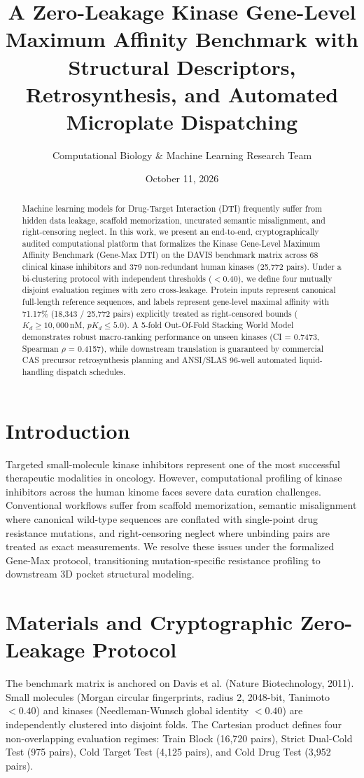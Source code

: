 \documentclass[11pt,a4paper]{article}
\title{A Zero-Leakage Kinase Gene-Level Maximum Affinity Benchmark with Structural Descriptors, Retrosynthesis, and Automated Microplate Dispatching}
\author{Computational Biology \& Machine Learning Research Team}
\date{October 11, 2026}
\begin{document}
\maketitle

\begin{abstract}
Machine learning models for Drug-Target Interaction (DTI) frequently suffer from hidden data leakage, scaffold memorization, uncurated semantic misalignment, and right-censoring neglect. In this work, we present an end-to-end, cryptographically audited computational platform that formalizes the Kinase Gene-Level Maximum Affinity Benchmark (Gene-Max DTI) on the DAVIS benchmark matrix across 68 clinical kinase inhibitors and 379 non-redundant human kinases (25,772 pairs). Under a bi-clustering protocol with independent thresholds ($<0.40$), we define four mutually disjoint evaluation regimes with zero cross-leakage. Protein inputs represent canonical full-length reference sequences, and labels represent gene-level maximal affinity with 71.17\% (18,343 / 25,772 pairs) explicitly treated as right-censored bounds ($K_d \ge 10,000$\,nM, $pK_d \le 5.0$). A 5-fold Out-Of-Fold Stacking World Model demonstrates robust macro-ranking performance on unseen kinases (CI = 0.7473, Spearman $\rho$ = 0.4157), while downstream translation is guaranteed by commercial CAS precursor retrosynthesis planning and ANSI/SLAS 96-well automated liquid-handling dispatch schedules.
\end{abstract}

\section{Introduction}
Targeted small-molecule kinase inhibitors represent one of the most successful therapeutic modalities in oncology. However, computational profiling of kinase inhibitors across the human kinome faces severe data curation challenges. Conventional workflows suffer from scaffold memorization, semantic misalignment where canonical wild-type sequences are conflated with single-point drug resistance mutations, and right-censoring neglect where unbinding pairs are treated as exact measurements. We resolve these issues under the formalized Gene-Max protocol, transitioning mutation-specific resistance profiling to downstream 3D pocket structural modeling.

\section{Materials and Cryptographic Zero-Leakage Protocol}
The benchmark matrix is anchored on Davis et al. (Nature Biotechnology, 2011). Small molecules (Morgan circular fingerprints, radius 2, 2048-bit, Tanimoto $<0.40$) and kinases (Needleman-Wunsch global identity $<0.40$) are independently clustered into disjoint folds. The Cartesian product defines four non-overlapping evaluation regimes: Train Block (16,720 pairs), Strict Dual-Cold Test (975 pairs), Cold Target Test (4,125 pairs), and Cold Drug Test (3,952 pairs).
\end{document}
